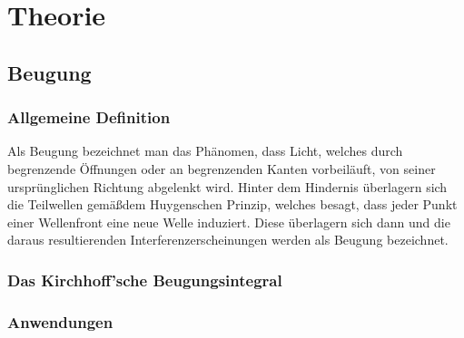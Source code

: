 \section{Theorie}


\subsection{Beugung}

\subsubsection{Allgemeine Definition}

Als Beugung bezeichnet man das Ph\"anomen, dass Licht, welches durch begrenzende \"Offnungen oder an begrenzenden Kanten vorbeil\"auft, von seiner urspr\"unglichen Richtung abgelenkt wird. Hinter dem Hindernis \"uberlagern sich die Teilwellen gem\"a\ss dem Huygenschen Prinzip, welches besagt, dass jeder Punkt einer Wellenfront eine neue Welle induziert. Diese \"uberlagern sich dann und die daraus resultierenden Interferenzerscheinungen werden als Beugung bezeichnet.

\subsubsection{Das Kirchhoff'sche Beugungsintegral}


\subsubsection{Anwendungen}


